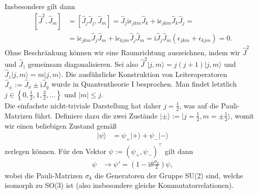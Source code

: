 \documentclass[english, parskip=full]{scrreport}
\newcommand{\kla}{}
\newcommand{\klam}{}
\newcommand{\klammer}{}
\newcommand{\Ket}{}
\renewcommand{\i}{\text{i}}
\begin{document}
Insbesondere gilt dann
\begin{align}
\klam\left[ \hat{J}^2, \hat{J}_m \right] &= \klam\left[ \hat{J}_j\hat{J}_j, \hat{J}_m \right] = \hat{J}_j\i\epsilon_{jkm}\hat{J}_k + \i\epsilon_{jkm}\hat{J}_k \hat{J}_j = \\
&= \i\epsilon_{jkm}\hat{J}_j\hat{J}_m + \i\epsilon_{kjm}\hat{J}_j\hat{J}_m = \i\hat{J}_j\hat{J}_m\kla\left( \epsilon_{jkm} + \epsilon_{kjm} \right) = 0.
\end{align}
Ohne Beschränkung können wir eine Raumrichtung auszeichnen, indem wir $\hat{J}^2$ und $\hat{J}_z$ gemeinsam diagonalisieren.
Sei also $\hat{J}^2\Ket | j,m \rangle = j(j+1)\Ket | j,m \rangle$ und $\hat{J}_z\Ket | j,m \rangle = m\Ket | j,m \rangle$.
Die ausführliche Konstruktion von Leiteroperatoren $\hat{J}_\pm := \hat{J}_x\pm\i\hat{J}_y$ wurde in Quantentheorie I besprochen.
Man findet letztlich $j\in\klammer\left\{ 0,\frac{1}{2},1,\frac{3}{2},\dots \right\}$ und $|m|\le j$.
\\
Die einfachste nicht-triviale Darstellung hat daher $j=\frac{1}{2}$, was auf die Pauli-Matrizen führt.
Definiere dazu die zwei Zustände $\Ket | \pm \rangle := \Ket | j=\frac{1}{2}, m=\pm\frac{1}{2} \rangle$, womit wir einen beliebigen Zustand gemäß
\begin{align}
\Ket | \psi \rangle &= \psi_+\Ket | + \rangle + \psi_- \Ket | - \rangle
\end{align}
zerlegen können.
Für den Vektor $\psi := (\psi_+,\psi_-)^\top$ gilt dann
\begin{align}
\psi&\rightarrow \psi' = \kla\left( 1 - \i\theta\frac{\sigma_k}{2} \right)\psi,
\end{align}
wobei die Pauli-Matrizen $\sigma_k$ die Generatoren der Gruppe SU(2) sind, welche isomorph zu SO(3) ist (also insbesondere gleiche Kommutatorrelationen).
\end{document}
